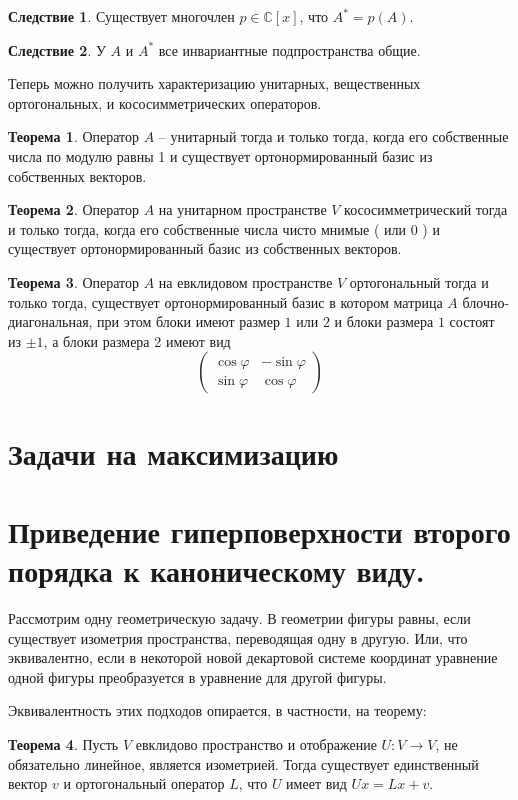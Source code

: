 \documentclass[10pt,a4paper,oneside]{book}
\theoremstyle{definition}
\newtheorem{thm}{Теорема}
\newtheorem{cor}{Следствие}
\newcommand{\mb}[1]{\mathbb{#1}}
\def\thrm{\begin{thm}}
\def\ethrm{\end{thm}}
\def\crl{\begin{cor}}
\def\ecrl{\end{cor}}
\begin{document}
\crl Существует многочлен $p\in \mb C[x]$, что $A^*=p(A)$.
\ecrl

\crl У $A$ и $A^*$ все инвариантные подпространства общие.
\ecrl

Теперь можно получить характеризацию унитарных, вещественных ортогональных, и кососимметрических операторов.

\thrm Оператор $A$ -- унитарный тогда и только тогда, когда его собственные числа по модулю равны 1 и существует ортонормированный базис из собственных векторов. 
\ethrm

\thrm Оператор $A$ на унитарном пространстве $V$ кососимметрический  тогда и только тогда, когда его собственные числа чисто мнимые ( или 0 ) и существует ортонормированный базис из собственных векторов. 
\ethrm

\thrm Оператор $A$ на евклидовом пространстве $V$ ортогональный  тогда и только тогда, существует ортонормированный базис в котором матрица $A$ блочно-диагональная, при этом блоки имеют размер $1$ или $2$ и блоки размера $1$ состоят из $\pm 1$, а блоки размера 2 имеют вид
$$\begin{pmatrix}
\cos \varphi & -\sin \varphi\\

\sin \varphi &\cos \varphi
\end{pmatrix}$$

\ethrm





\section{Задачи на максимизацию}

\section*{Приведение гиперповерхности второго порядка к каноническому виду.}

Рассмотрим одну геометрическую задачу. В геометрии фигуры равны, если существует изометрия пространства, переводящая одну в другую. Или, что эквивалентно, если в некоторой новой декартовой системе координат уравнение одной фигуры преобразуется в уравнение для другой фигуры. 

Эквивалентность этих подходов опирается, в частности, на теорему:
\thrm Пусть $V$ евклидово пространство и отображение $U\colon V\to V$, не обязательно линейное, является изометрией. Тогда существует единственный вектор $v$ и ортогональный оператор $L$, что $U$ имеет вид $Ux=Lx+v$. 
\ethrm
\end{document}
